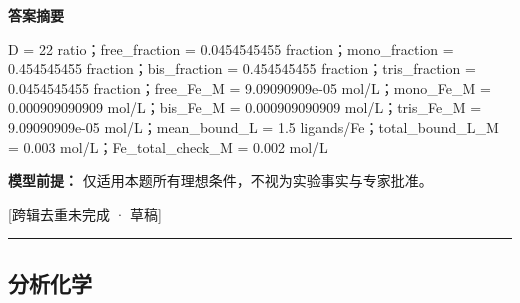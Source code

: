 \documentclass[UTF8,11pt,a4paper]{ctexart}
\begin{document}
\noindent\textbf{答案摘要}\par
D = 22 ratio；free\_fraction = 0.0454545455 fraction；mono\_fraction = 0.454545455 fraction；bis\_fraction = 0.454545455 fraction；tris\_fraction = 0.0454545455 fraction；free\_Fe\_M = 9.09090909e-05 mol/L；mono\_Fe\_M = 0.000909090909 mol/L；bis\_Fe\_M = 0.000909090909 mol/L；tris\_Fe\_M = 9.09090909e-05 mol/L；mean\_bound\_L = 1.5 ligands/Fe；total\_bound\_L\_M = 0.003 mol/L；Fe\_total\_check\_M = 0.002 mol/L\par
\noindent\textbf{模型前提：}
仅适用本题所有理想条件，不视为实验事实与专家批准。\par
\noindent\textcolor{red!65!black}{[跨辑去重未完成 · 草稿]} \par
\medskip\hrule\medskip
\subsection*{分析化学}
\end{document}
